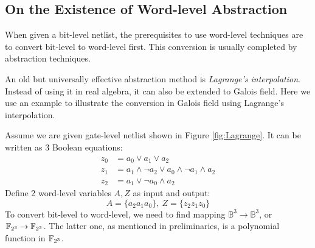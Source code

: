 \subsection{On the Existence of Word-level Abstraction}
When given a bit-level netlist, the prerequisites to use word-level techniques are to convert bit-level 
to word-level first. This conversion is usually completed by abstraction techniques.

An old but universally effective abstraction method is {\it Lagrange's interpolation}. Instead of using 
it in real algebra, it can also be extended to Galois field. Here we use an example to illustrate the 
conversion in Galois field using Lagrange's interpolation.

\begin{Example}

\begin{figure}[H]
\end{figure}

Assume we are given gate-level netlist shown in Figure \ref{fig:Lagrange}. It can be written as 3 
Boolean equations:
\begin{align*}
z_0 &= a_0 \lor a_1 \lor a_2 \\
z_1 &= a_1 \land \neg a_2 \lor a_0 \land \neg a_1 \land a_2 \\
z_2 &= a_1 \lor \neg a_0 \land a_2
\end{align*}
Define 2 word-level variables $A,Z$ as input and output:
$$A = \{a_2a_1a_0\},~Z = \{z_2z_1z_0\}$$
To convert bit-level to word-level, we need to find mapping $\mathbb{B}^3 \rightarrow \mathbb{B}^3$,
or ${\mathbb{F}}_{2^3} \rightarrow {\mathbb{F}}_{2^3}$. The latter one, as mentioned in preliminaries, is a polynomial
function in ${\mathbb{F}}_{2^3}$.


\end{Example}
